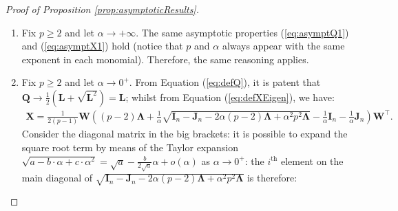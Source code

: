 \documentclass[12pt]{article}
\theoremstyle{plain}
\theoremstyle{remark}
\newcommand{\round}[1]{\left( #1 \right)}
\newcommand{\Corr}[2]{\mathbb{C}{\rm or}\round{#1,#2}}
\newcommand{\dVec}[1]{{\bm{#1}}}            %
\newcommand{\latMatr}[1]{\mathbf{#1}}          %
\newcommand{\grMatr}[1]{{\boldsymbol{#1}}}   %
\begin{document}
\begin{proof}[Proof of Proposition \ref{prop:asymptoticResults}]
\begin{enumerate}
\begin{align}
                &{\dVec{\delta}_{ {1,V}}^\top \Tilde {\grMatr{\Sigma}} \dVec{\delta}_{ {1,V}} + \dVec{\delta}_{ {2,V}}^\top \Tilde {\grMatr{\Sigma}} \dVec{\delta}_{ {2,V}}-2\dVec{\delta}_{ {1,V}}^\top \Tilde {\latMatr{X}} \dVec{\delta}_{ {2,V}}}\\
                &=\dVec{\delta}_{ {1,V}}^\top {\grMatr{\Sigma}} \dVec{\delta}_{ {1,V}} + \dVec{\delta}_{ {2,V}}^\top {\grMatr{\Sigma}} \dVec{\delta}_{ {2,V}}-2\dVec{\delta}_{ {1,V}}^\top {\latMatr{X}} \dVec{\delta}_{ {2,V}} +2k_1-2k_2.\nonumber
            \end{align}
            In this case, 
            \begin{equation*}
                (\ref{eq:appZ_V_contributionOnD}) \to \round{\dVec{\delta}_{ {1,V}}-\dVec{\delta}_{ {2,V}}}^\top \Tilde {\grMatr{\Sigma}} \round{\dVec{\delta}_{ {1,V}}-\dVec{\delta}_{ {2,V}}}
            \end{equation*}
            If we add the hypothesis $\beta\to 1$, $\Corr{Z_{E,i}}{Z_{E,j}}\to 1$ as well. This implies that all the $p\times p$ entries of $\latMatr D(u_1,u_2)$ converge to the same term, that is $d_R(u_1,u_2)$.
            \item Fix $p\geq 2$ and let $\alpha\to +\infty$. The same asymptotic properties (\ref{eq:asymptQ1}) and (\ref{eq:asymptX1}) hold (notice that $p$ and $\alpha$ always appear with the same exponent in each monomial). Therefore, the same reasoning applies.
            \item Fix $p\geq 2$ and let $\alpha\to 0^+.$ From Equation (\ref{eq:defQ}), it is patent that $\latMatr Q \to \frac{1}{2}(\latMatr L + \sqrt{\latMatr L^2})=\latMatr L$; whilst from Equation (\ref{eq:defXEigen}), we have:
            \begin{align*}
                \latMatr X = \frac{1}{2(p-1)} \latMatr W \round{(p-2)\grMatr{\Lambda} + \frac{1}{\alpha}\sqrt{\latMatr I_n - \latMatr J_n - 2\alpha (p-2) \grMatr{\Lambda} + \alpha^2 p^2 \grMatr{\Lambda}} - \frac{1}{\alpha}\latMatr I_n - \frac{1}{\alpha}\latMatr J_n} \latMatr W^\top.
            \end{align*}
            Consider the diagonal matrix in the big brackets: it is possible to expand the square root term by means of the Taylor expansion $\sqrt{a-b\cdot\alpha+c\cdot \alpha^2}=\sqrt{a}-\frac{b}{2\sqrt{a}} \alpha + o(\alpha)$ as $\alpha \to 0^+$: the $i^\text{th}$ element on the main diagonal of $\sqrt{\latMatr I_n - \latMatr J_n - 2\alpha (p-2) \grMatr{\Lambda} + \alpha^2 p^2 \grMatr{\Lambda}}$ is therefore:
            \begin{equation*}

\end{equation*}
\end{enumerate}
\end{proof}
\end{document}
